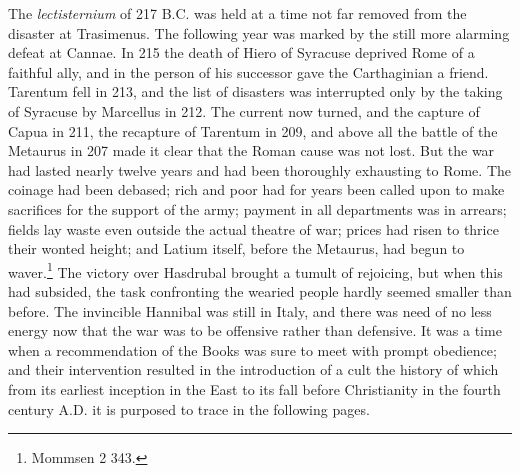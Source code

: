 \documentclass[a4paper, 11pt, oneside, polutonikogreek, english]{article}
\begin{document}
The \emph{lectisternium} of 217 \textsc{B.C.} was held at a time not far removed from the disaster at Trasimenus. The following year was marked by the still more alarming defeat at Cannae. In 215 the death of Hiero of Syracuse deprived Rome of a faithful ally, and in the person of his successor gave the Carthaginian a friend. Tarentum fell in 213, and the list of disasters was interrupted only by the taking of Syracuse by Marcellus in 212. The current now turned, and the capture of Capua in 211, the recapture of Tarentum in 209, and above all the battle of the Metaurus in 207 made it clear that the Roman cause was not lost. But the war had lasted nearly twelve years and had been thoroughly exhausting to Rome. The coinage had been debased; rich and poor had for years been called upon to make sacrifices for the support of the army; payment in all departments was in arrears; fields lay waste even outside the actual theatre of war; prices had risen to thrice their wonted height; and Latium itself, before the Metaurus, had begun to waver.\footnote{Mommsen 2 343.} The victory over Hasdrubal brought a tumult of rejoicing, but when this had subsided, the task confronting the wearied people hardly seemed smaller than before. The invincible Hannibal was still in Italy, and there was need of no less energy now that the war was to be offensive rather than defensive. It was a time when a recommendation of the Books was sure to meet with prompt obedience; and their intervention resulted in the introduction of a cult the history of which from its earliest inception in the East to its fall before Christianity in the fourth century \textsc{A.D.} it is purposed to trace in the following pages.
\end{document}

